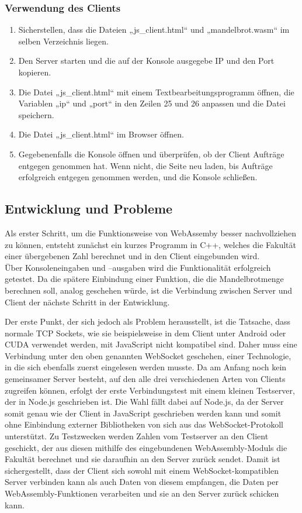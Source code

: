 \documentclass[12pt, onecolumn, notitlepage]{scrartcl}
\begin{document}
\subsubsection{Verwendung des Clients}
\begin{enumerate}
	\setlength\itemsep{0.07em}
	\item Sicherstellen, dass die Dateien „js\_client.html“ und „mandelbrot.wasm“ im selben Verzeichnis liegen.
	\item Den Server starten und die auf der Konsole ausgegebe IP und den Port kopieren.
	\item Die Datei „js\_client.html“ mit einem Textbearbeitungsprogramm öffnen, die Variablen „ip“ und „port“ in den Zeilen 25 und 26 anpassen und die Datei speichern.
	\item Die Datei „js\_client.html“ im Browser öffnen.
	\item Gegebenenfalls die Konsole öffnen und überprüfen, ob der Client Aufträge entgegen genommen hat. Wenn nicht, die Seite neu laden, bis Aufträge erfolgreich entgegen genommen werden, und die Konsole schließen.
\end{enumerate}
\subsection{Entwicklung und Probleme}
Als erster Schritt, um die Funktionsweise von WebAssemby  besser nachvollziehen zu können, entsteht zunächst ein kurzes Programm in C++, welches die Fakultät einer übergebenen Zahl berechnet und in den Client eingebunden wird. \\
Über Konsoleneingaben und –ausgaben wird die Funktionalität erfolgreich getestet. Da die spätere Einbindung einer Funktion, die die Mandelbrotmenge berechnen soll, analog geschehen würde, ist die Verbindung zwischen Server und Client der nächste Schritt in der Entwicklung. \par

Der erste Punkt, der sich jedoch als Problem herausstellt, ist die Tatsache, dass normale TCP Sockets, wie sie beispielsweise in dem Client unter Android oder CUDA verwendet werden, mit JavaScript nicht kompatibel sind. Daher muss eine Verbindung unter den oben genannten WebSocket geschehen, einer Technologie, in die sich ebenfalls zuerst eingelesen werden musste. Da am Anfang noch kein gemeinsamer Server besteht, auf den alle drei verschiedenen Arten von Clients zugreifen können, erfolgt der erste Verbindungstest mit einem kleinen Testserver, der in Node.js geschrieben ist. Die Wahl fällt dabei auf Node.js, da der Server somit genau wie der Client in JavaScript geschrieben werden kann und somit ohne Einbindung externer Bibliotheken von sich aus das WebSocket-Protokoll unterstützt. Zu Testzwecken werden Zahlen vom Testserver an den Client geschickt, der aus diesen mithilfe des eingebundenen WebAssembly-Moduls die Fakultät berechnet und sie daraufhin an den Server zurück sendet. Damit ist sichergestellt, dass der Client sich sowohl mit einem WebSocket-kompatiblen Server verbinden kann als auch Daten von diesem empfangen, die Daten per WebAssembly-Funktionen verarbeiten und sie an den Server zurück schicken kann. \par
\end{document}
